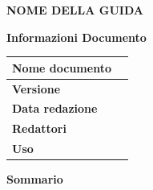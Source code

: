 %


\thispagestyle{empty}
\setlength{\topmargin}{70pt}
\begin{center}
	\Large \textbf{NOME DELLA GUIDA}
\end{center}

\begin{center}
\vspace{1.5cm}
	\textbf{\Large Informazioni Documento} \\[1pt]
	\begin{longtable}{|l|p{180pt}|}
		\hline
		\textbf{Nome documento} & \documentName \\
		\hline
		\textbf{Versione} & \documentVersion \\
		\hline
		\textbf{Data redazione} & \documentDate \\
		\hline
		\textbf{Redattori} & \parbox[t]{\textwidth}{\documentEditors} \\
		\hline
		\textbf{Uso} & \parbox{\textwidth}{\documentUsage} \\
		\hline
	\end{longtable}
	\vspace{20pt}
		\textbf{\Large Sommario} \\
		\documentSummary
\end{center}
